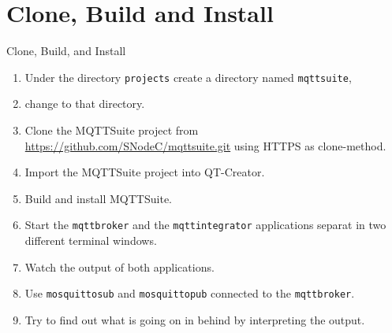﻿\section[withsectionpage]{Clone, Build and Install}

\begin{frame}{Clone, Build, and Install}
  \begin{enumerate}
    \item Under the directory \lstinline|projects| create a directory named \lstinline|mqttsuite|,
    \item change to that directory.
    \item Clone the MQTTSuite project from \alert{\href{https://github.com/SNodeC/mqttsuite.git}{https://github.com/SNodeC/mqttsuite.git}} using \alert{HTTPS} as clone-method.
    \item Import the MQTTSuite project into QT-Creator.
    \item Build and install MQTTSuite.
    \item Start the \texttt{\alert{mqttbroker}} and the \texttt{\alert{mqttintegrator}} applications separat in two different terminal windows.
    \item Watch the output of both applications.
    \item Use \texttt{\alert{mosquitto\textunderscore{}sub}} and  \texttt{\alert{mosquitto\textunderscore{}pub}} connected to the \texttt{\alert{mqttbroker}}.
    \item Try to find out what is going on in behind by interpreting the output.
  \end{enumerate}
\end{frame}
